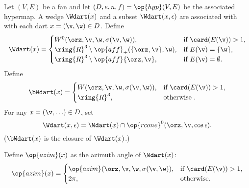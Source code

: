 \begin{definition}[$\Wdart$,~$\bWdart$]
Let $(V,E)$ be a fan and let $(D,e,n,f) = \op{hyp}(V,E)$
be the associated hypermap.  
A wedge $\Wdart(x)$ and a subset $\Wdart(x,\epsilon)$ are associated with
with each dart $x=(\v,\w)\in D$.  Define 
%
%
%
%
%
%
%
%
%
\begin{displaymath}
\Wdart(x)=
\begin{cases} 
W^0(\orz,\v,\w,\sigma(\v,\w)),&\text{if }\card(E(\v))>1,\\
\ring{R}^3\setminus \op{aff}_+(\{\orz,\v\},\w),&\text{if } E(\v) = \{\w\},\\
\ring{R}^3\setminus \op{aff}\{\orz,\v\},&\text{if } E(\v) = \emptyset.\\
\end{cases}
\end{displaymath}
Define
\begin{displaymath}
\bWdart(x) = 
\begin{cases} 
W(\orz,\v,\w,\sigma(\v,\w)),&\text{if }\card(E(\v))>1,\\
\ring{R}^3,&\text{otherwise }.\\
\end{cases}
\end{displaymath}
For any $x = (\v,\ldots)\in D$, set
\begin{displaymath}
\Wdart(x,\epsilon) = \Wdart(x) \cap \op{rcone}^0(\orz,\v,\cos\epsilon).
\end{displaymath}
%
($\bWdart(x)$ is the closure of $\Wdart(x)$.)
\end{definition}

\begin{definition}[$\op{azim}$]
Define $\op{azim}(x)$ as the azimuth angle of $\Wdart(x)$:
%
\begin{displaymath}
\op{azim}(x)=\begin{cases}
\op{azim}(\orz,\v,\w,\sigma(\v,\w)), &\text{if } \card(E(\v)) > 1,\\
2\pi, & \text{otherwise.}\\
\end{cases}
\end{displaymath}
\end{definition}

